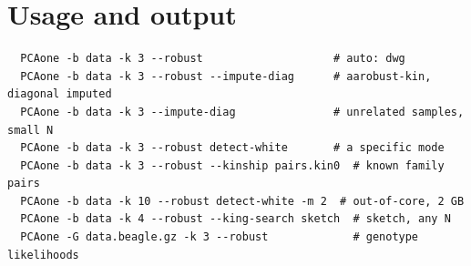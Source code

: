\documentclass[11pt,a4paper]{article}
\begin{document}
\section{Usage and output}

\begin{verbatim}
  PCAone -b data -k 3 --robust                    # auto: dwg
  PCAone -b data -k 3 --robust --impute-diag      # aarobust-kin, diagonal imputed
  PCAone -b data -k 3 --impute-diag               # unrelated samples, small N
  PCAone -b data -k 3 --robust detect-white       # a specific mode
  PCAone -b data -k 3 --robust --kinship pairs.kin0  # known family pairs
  PCAone -b data -k 10 --robust detect-white -m 2  # out-of-core, 2 GB
  PCAone -b data -k 4 --robust --king-search sketch  # sketch, any N
  PCAone -G data.beagle.gz -k 3 --robust             # genotype likelihoods
\end{verbatim}
\end{document}
